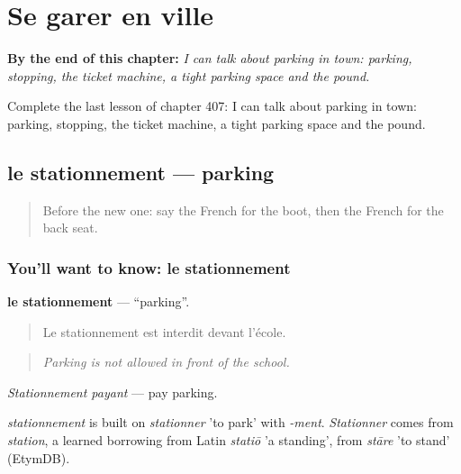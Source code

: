 
\chapter{Se garer en ville}
\label{ch:fr-se-garer-en-ville}

\begin{chapteropening}
\textbf{By the end of this chapter:} \emph{I can talk about parking in town: parking, stopping, the ticket machine, a tight parking space and the pound.}

Complete the last lesson of chapter 407: I can talk about parking in town: parking, stopping, the ticket machine, a tight parking space and the pound.
\end{chapteropening}

\section[le stationnement]{le stationnement — parking}

\label{lesson:FR-C407-stationnement}



\begin{quote}
Before the new one: say the French for the boot, then the French for the back seat.
\end{quote}

\subsection*{You'll want to know: le stationnement}
\textbf{le stationnement} — \textquotedblleft{}parking\textquotedblright{}.

\begin{quote}
Le stationnement est interdit devant l'école.
\end{quote}

\begin{quote}
\emph{Parking is not allowed in front of the school.}
\end{quote}

\emph{Stationnement payant} — pay parking.

\begin{cousinweb}
\emph{stationnement} is built on \emph{stationner} 'to park' with \emph{-ment}. \emph{Stationner} comes from \emph{station}, a learned borrowing from Latin \emph{statiō} 'a standing', from \emph{stāre} 'to stand' (EtymDB).
\end{cousinweb}

